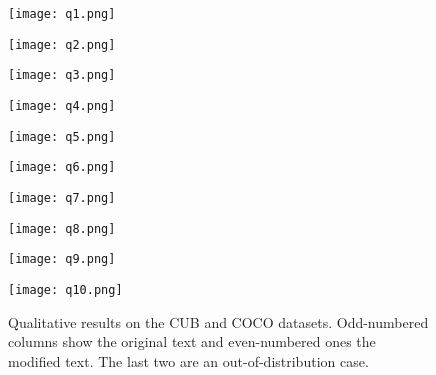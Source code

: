 \documentclass{article}
\begin{document}
\begin{figure}[t]
\begin{minipage}{0.092\textwidth}
\texttt{[image: q1.png]}
\end{minipage}
\begin{minipage}{0.092\textwidth}
\texttt{[image: q2.png]}
\end{minipage}
\noindent\begin{minipage}{0.092\textwidth}
\texttt{[image: q3.png]}
\end{minipage}
\noindent\begin{minipage}{0.092\textwidth}
\texttt{[image: q4.png]}
\end{minipage}
\noindent\begin{minipage}{0.092\textwidth}
\texttt{[image: q5.png]}
\end{minipage}
\noindent\begin{minipage}{0.092\textwidth}
\texttt{[image: q6.png]}
\end{minipage}
\noindent\begin{minipage}{0.092\textwidth}
\texttt{[image: q7.png]}
\end{minipage}
\noindent\begin{minipage}{0.092\textwidth}
\texttt{[image: q8.png]}
\end{minipage}
\noindent\begin{minipage}{0.092\textwidth}
\texttt{[image: q9.png]}
\end{minipage}
\noindent\begin{minipage}{0.092\textwidth}
\texttt{[image: q10.png]}
\end{minipage}
\hfill 

\centering
\caption{Qualitative results on the CUB and COCO datasets. Odd-numbered columns show the original text and even-numbered ones the modified text. The last two are an out-of-distribution case.}
\label{fig:qual_show}
\bigskip


\end{figure}
\end{document}
